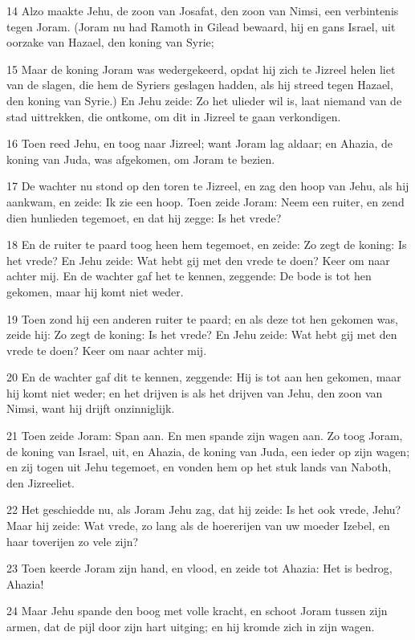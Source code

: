 \par 14 Alzo maakte Jehu, de zoon van Josafat, den zoon van Nimsi, een verbintenis tegen Joram. (Joram nu had Ramoth in Gilead bewaard, hij en gans Israel, uit oorzake van Hazael, den koning van Syrie;
\par 15 Maar de koning Joram was wedergekeerd, opdat hij zich te Jizreel helen liet van de slagen, die hem de Syriers geslagen hadden, als hij streed tegen Hazael, den koning van Syrie.) En Jehu zeide: Zo het ulieder wil is, laat niemand van de stad uittrekken, die ontkome, om dit in Jizreel te gaan verkondigen.
\par 16 Toen reed Jehu, en toog naar Jizreel; want Joram lag aldaar; en Ahazia, de koning van Juda, was afgekomen, om Joram te bezien.
\par 17 De wachter nu stond op den toren te Jizreel, en zag den hoop van Jehu, als hij aankwam, en zeide: Ik zie een hoop. Toen zeide Joram: Neem een ruiter, en zend dien hunlieden tegemoet, en dat hij zegge: Is het vrede?
\par 18 En de ruiter te paard toog heen hem tegemoet, en zeide: Zo zegt de koning: Is het vrede? En Jehu zeide: Wat hebt gij met den vrede te doen? Keer om naar achter mij. En de wachter gaf het te kennen, zeggende: De bode is tot hen gekomen, maar hij komt niet weder.
\par 19 Toen zond hij een anderen ruiter te paard; en als deze tot hen gekomen was, zeide hij: Zo zegt de koning: Is het vrede? En Jehu zeide: Wat hebt gij met den vrede te doen? Keer om naar achter mij.
\par 20 En de wachter gaf dit te kennen, zeggende: Hij is tot aan hen gekomen, maar hij komt niet weder; en het drijven is als het drijven van Jehu, den zoon van Nimsi, want hij drijft onzinniglijk.
\par 21 Toen zeide Joram: Span aan. En men spande zijn wagen aan. Zo toog Joram, de koning van Israel, uit, en Ahazia, de koning van Juda, een ieder op zijn wagen; en zij togen uit Jehu tegemoet, en vonden hem op het stuk lands van Naboth, den Jizreeliet.
\par 22 Het geschiedde nu, als Joram Jehu zag, dat hij zeide: Is het ook vrede, Jehu? Maar hij zeide: Wat vrede, zo lang als de hoererijen van uw moeder Izebel, en haar toverijen zo vele zijn?
\par 23 Toen keerde Joram zijn hand, en vlood, en zeide tot Ahazia: Het is bedrog, Ahazia!
\par 24 Maar Jehu spande den boog met volle kracht, en schoot Joram tussen zijn armen, dat de pijl door zijn hart uitging; en hij kromde zich in zijn wagen.
